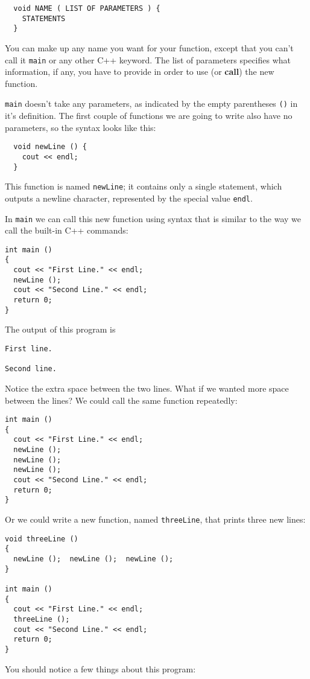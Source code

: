\begin{lstlisting}
  void NAME ( LIST OF PARAMETERS ) {
    STATEMENTS
  }
\end{lstlisting}
%
You can make up any name you want for your function, except
that you can't call it {\tt main} or any other
C++ keyword.  The list of
parameters specifies what information, if any, you have to
provide in order to use (or {\bf call}) the new function.

{\tt main} doesn't take any parameters, as indicated by
the empty parentheses {\tt ()} in it's definition.  The first couple
of functions we are going to write also have no parameters, so the
syntax looks like this:

\begin{lstlisting}
  void newLine () {
    cout << endl;
  }
\end{lstlisting}
%
This function is named {\tt newLine}; it contains only a single
statement, which outputs a newline character, represented by
the special value {\tt endl}.

In {\tt main} we can call this new function using syntax that
is similar to the way we call the built-in C++ commands:

\begin{lstlisting}
int main ()
{
  cout << "First Line." << endl;
  newLine ();
  cout << "Second Line." << endl;
  return 0;
}
\end{lstlisting}
%
The output of this program is

\begin{lstlisting}
First line.

Second line.
\end{lstlisting}
%
Notice the extra space between the two lines.  What if we wanted
more space between the lines?  We could call the same
function repeatedly:

\begin{lstlisting}
int main ()
{
  cout << "First Line." << endl;
  newLine ();
  newLine ();
  newLine ();
  cout << "Second Line." << endl;
  return 0;
}
\end{lstlisting}
%
Or we could write a new function, named {\tt threeLine}, that 
prints three new lines:

\begin{lstlisting}
void threeLine ()
{
  newLine ();  newLine ();  newLine ();
}

int main ()
{
  cout << "First Line." << endl;
  threeLine ();
  cout << "Second Line." << endl;
  return 0;
}
\end{lstlisting}
%
You should notice a few things about this program:


